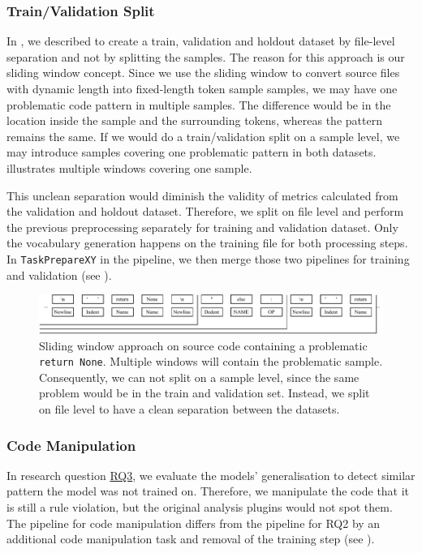 \subsubsection{Train/Validation Split}\label{sec:train_test_split}
In , we described to create a train, validation and holdout dataset by file-level separation and not by splitting the samples. The reason for this approach is our sliding window concept. Since we use the sliding window to convert source files with dynamic length into fixed-length token sample samples, we may have one problematic code pattern in multiple samples. The difference would be in the location inside the sample and the surrounding tokens, whereas the pattern remains the same.
If we would do a train/validation split on a sample level, we may introduce samples covering one problematic pattern in both datasets.  illustrates multiple windows covering one sample. 

This unclean separation would diminish the validity of metrics calculated from the validation and holdout dataset. Therefore, we split on file level and perform the previous preprocessing separately for training and validation dataset. Only the vocabulary generation happens on the training file for both processing steps. In \texttt{TaskPrepareXY} in the pipeline, we then merge those two pipelines for training and validation (see ).
\begin{figure}
    \includegraphics[width=1\textwidth]{img/ML/encoding_sliding_window_problem.pdf}
    \caption{Sliding window approach on source code containing a problematic \texttt{return None}. Multiple windows will contain the problematic sample. Consequently, we can not split on a sample level, since the same problem would be in the train and validation set. Instead, we split on file level to have a clean separation between the datasets.}
    \label{fig:encoding_sliding_window}
\end{figure}

\subsubsection{Code Manipulation}\label{sec:approach_code_manipulation}
In research question \hyperref[rq:3]{RQ3}, we evaluate the models' generalisation to detect similar pattern the model was not trained on. Therefore, we manipulate the code that it is still a rule violation, but the original analysis plugins would not spot them. The pipeline for code manipulation differs from the pipeline for RQ2 by an additional code manipulation task and removal of the training step (see ).

